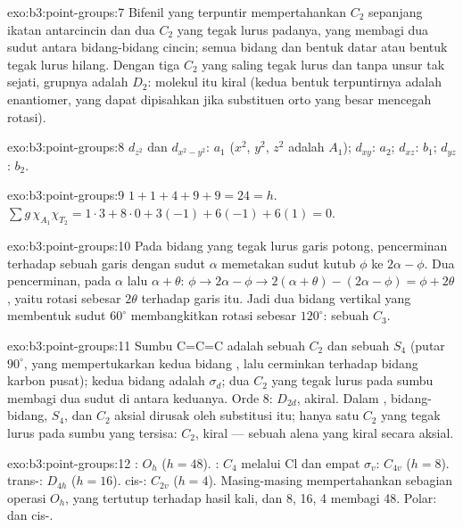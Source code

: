 \begin{solution}{exo:b3:point-groups:7}
Bifenil yang terpuntir mempertahankan $C_2$ sepanjang ikatan antarcincin dan
dua $C_2$ yang tegak lurus padanya, yang membagi dua sudut antara bidang-bidang
cincin; semua bidang dan  bentuk datar atau bentuk tegak lurus
hilang. Dengan tiga $C_2$ yang saling tegak lurus dan tanpa unsur tak sejati,
grupnya adalah $D_2$: molekul itu kiral (kedua bentuk terpuntirnya adalah
enantiomer, yang dapat dipisahkan jika substituen orto yang besar mencegah
rotasi).
\end{solution}

\begin{solution}{exo:b3:point-groups:8}
$d_{z^2}$ dan $d_{x^2-y^2}$: $a_1$ ($x^2$, $y^2$, $z^2$ adalah $A_1$); $d_{xy}$:
$a_2$; $d_{xz}$: $b_1$; $d_{yz}$: $b_2$.
\end{solution}

\begin{solution}{exo:b3:point-groups:9}
$1 + 1 + 4 + 9 + 9 = 24 = h$. $\sum g\,\chi_{A_1}\chi_{T_2} = 1\cdot3 + 8\cdot0 + 3(-1)
+ 6(-1) + 6(1) = 0$.
\end{solution}

\begin{solution}{exo:b3:point-groups:10}
Pada bidang yang tegak lurus garis potong, pencerminan terhadap sebuah garis
dengan sudut $\alpha$ memetakan sudut kutub $\phi$ ke $2\alpha - \phi$. Dua
pencerminan, pada $\alpha$ lalu $\alpha + \theta$: $\phi \to 2\alpha - \phi \to 2(\alpha + \theta) - (2\alpha - \phi) =
\phi + 2\theta$, yaitu rotasi sebesar $2\theta$ terhadap garis itu. Jadi dua
bidang vertikal yang membentuk sudut $60^\circ$ membangkitkan rotasi sebesar
$120^\circ$: sebuah $C_3$.
\end{solution}

\begin{solution}{exo:b3:point-groups:11}
Sumbu C=C=C adalah sebuah $C_2$ dan sebuah $S_4$ (putar $90^\circ$, yang
mempertukarkan kedua bidang , lalu cerminkan terhadap bidang karbon
pusat); kedua bidang  adalah $\sigma_d$; dua $C_2$ yang tegak lurus pada
sumbu membagi dua sudut di antara keduanya. Orde 8: $D_{2d}$, akiral. Dalam
, bidang-bidang, $S_4$, dan $C_2$ aksial dirusak oleh
substitusi itu; hanya satu $C_2$ yang tegak lurus pada sumbu yang tersisa:
$C_2$, kiral --- sebuah alena yang kiral secara aksial.
\end{solution}

\begin{solution}{exo:b3:point-groups:12}
: $O_h$ ($h = 48$). : $C_4$ melalui Cl dan empat $\sigma_v$:
$C_{4v}$ ($h = 8$). trans-: $D_{4h}$ ($h = 16$). cis-: $C_{2v}$ ($h
= 4$). Masing-masing mempertahankan sebagian operasi $O_h$, yang tertutup
terhadap hasil kali, dan 8, 16, 4 membagi 48. Polar:  dan
cis-.
\end{solution}


